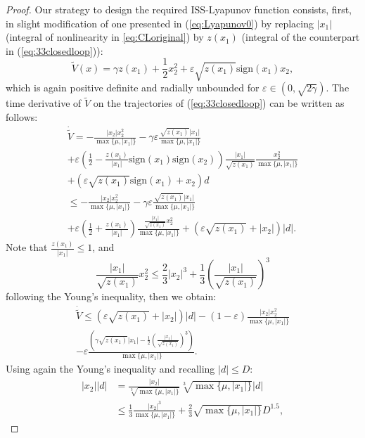 \documentclass[10pt,a4paper]{amsart}
\begin{document}
\begin{proof}
Our strategy to design the required ISS-Lyapunov function consists,
first, in slight modification of one presented in (\ref{eq:Lyapunov0})
by replacing $|x_{1}|$ (integral of nonlinearity in \eqref{eq:CLoriginal})
by $z(x_{1})$ (integral of the counterpart in (\ref{eq:33closedloop})):
\[
\tilde{V}(x)=\gamma z(x_{1})+\frac{1}{2}x_{2}^{2}+\varepsilon\sqrt{z(x_{1})}\text{sign}(x_{1})x_{2},
\]
which is again positive definite and radially unbounded for $\varepsilon\in(0,\sqrt{2\gamma})$.
The time derivative of $\tilde{V}$ on the trajectories of (\ref{eq:33closedloop})
can be written as follows:
\begin{gather*}
\dot{\tilde{V}}=-\frac{|x_{2}|x_{2}^{2}}{\max\{\mu,|x_{1}|\}}-\gamma\varepsilon\frac{\sqrt{z(x_{1})}|x_{1}|}{\max\{\mu,|x_{1}|\}}\\
+\varepsilon\left(\frac{1}{2}-\frac{z(x_{1})}{|x_{1}|}\text{sign}(x_{1})\text{sign}(x_{2})\right)\frac{|x_{1}|}{\sqrt{z(x_{1})}}\frac{x_{2}^{2}}{\max\{\mu,|x_{1}|\}}\\
+(\varepsilon\sqrt{z(x_{1})}\text{sign}(x_{1})+x_{2})d\\
\leq-\frac{|x_{2}|x_{2}^{2}}{\max\{\mu,|x_{1}|\}}-\gamma\varepsilon\frac{\sqrt{z(x_{1})}|x_{1}|}{\max\{\mu,|x_{1}|\}}\\
+\varepsilon\left(\frac{1}{2}+\frac{z(x_{1})}{|x_{1}|}\right)\frac{\frac{|x_{1}|}{\sqrt{z(x_{1})}}x_{2}^{2}}{\max\{\mu,|x_{1}|\}}+(\varepsilon\sqrt{z(x_{1})}+|x_{2}|)|d|.
\end{gather*}
Note that $\frac{z(x_{1})}{|x_{1}|}\leq1$, and
\[
\frac{|x_{1}|}{\sqrt{z(x_{1})}}x_{2}^{2}\leq\frac{2}{3}|x_{2}|^{3}+\frac{1}{3}\left(\frac{|x_{1}|}{\sqrt{z(x_{1})}}\right)^{3}
\]
following the Young's inequality, then we obtain:
\begin{gather*}
\dot{\tilde{V}}\leq(\varepsilon\sqrt{z(x_{1})}+|x_{2}|)|d|-(1-\varepsilon)\frac{|x_{2}|x_{2}^{2}}{\max\{\mu,|x_{1}|\}}\\
-\varepsilon\frac{\left(\gamma\sqrt{z(x_{1})}|x_{1}|-\frac{1}{2}\left(\frac{|x_{1}|}{\sqrt{z(x_{1})}}\right)^{3}\right)}{\max\{\mu,|x_{1}|\}}.
\end{gather*}
Using again the Young's inequality and recalling $|d|\leq D$:
\begin{align*}
|x_{2}||d| & =\frac{|x_{2}|}{\sqrt[3]{\max\{\mu,|x_{1}|\}}}\sqrt[3]{\max\{\mu,|x_{1}|\}}|d|\\
 & \leq\frac{1}{3}\frac{|x_{2}|^{3}}{\max\{\mu,|x_{1}|\}}+\frac{2}{3}\sqrt{\max\{\mu,|x_{1}|\}}D^{1.5},
\end{align*}

\end{proof}
\end{document}
